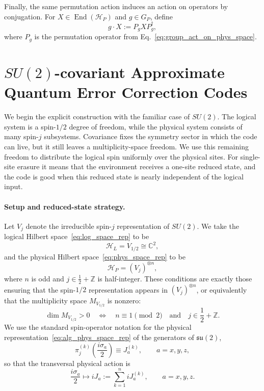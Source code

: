 \documentclass[10pt,twocolumn,superscriptaddress,aps,amsmath,amssymb,citeautoscript,floatfix,prx]{revtex4-2}
\newcounter{alg}
\theoremstyle{plain}
\theoremstyle{plain}
\theoremstyle{plain}
\theoremstyle{plain}
\theoremstyle{plain}
\theoremstyle{plain}
\theoremstyle{plain}
\theoremstyle{definition}
\theoremstyle{plain}
\begin{document}
Finally, the same permutation action induces an action on operators by conjugation. For $X\in\operatorname{End}(\mathcal H_P)$ and $g\in G_P$, define
\begin{equation}\label{eq:group_act_oper}
g\cdot X
:=
P_gXP_g^\dagger,
\end{equation}
where $P_g$ is the permutation operator from Eq.~\eqref{eq:group_act_on_phys_space}.

\section{\texorpdfstring{$SU(2)$}{SU(2)}-covariant Approximate Quantum Error Correction Codes}\label{sec:main_su2}

We begin the explicit construction with the familiar case of $SU(2)$. The logical system is a spin-$1/2$ degree of freedom, 
while the physical system consists of many spin-$j$ subsystems. Covariance fixes the symmetry sector in which the code can live, but it still leaves a multiplicity-space freedom. We use this remaining freedom to distribute the logical spin uniformly over the physical sites. For single-site erasure it means that the environment receives a one-site reduced state, and the code is good when this reduced state is nearly independent of the logical input.

\paragraph{Setup and reduced-state strategy.}

Let $V_j$ denote the irreducible spin-$j$ representation of $SU(2)$. We take the logical Hilbert space~\eqref{eq:log_space_rep} to be
\[
    \mathcal H_L = V_{1/2}\cong \mathbb C^2,
\]
and the physical Hilbert space~\eqref{eq:phys_space_rep} to be
\[
    \mathcal H_P = (V_j)^{\otimes n},
\]
where $n$ is odd and $j\in \frac12+\mathbb Z$ is half-integer. These conditions are exactly those ensuring that the spin-$1/2$ representation 
appears in $(V_j)^{\otimes n}$, or equivalently that the multiplicity space $M_{V_{1/2}}$ is nonzero:
\[
    \dim M_{V_{1/2}}>0
    \quad\Longleftrightarrow\quad
    n\equiv 1 \pmod 2
    \quad\text{and}\quad
    j\in \frac12+\mathbb Z .
\]
We use the standard spin-operator notation for the physical representation~\eqref{eq:alg_phys_space_rep} of the generators of $\mathfrak{su}(2)$,
\[
    \pi_j^{(k)}\left(\frac{i\sigma_a}{2}\right)
    \equiv J_a^{(k)},
    \qquad a=x,y,z,
\]
so that the transversal physical action is
\begin{equation}\label{eq:su2_cov_rep}
    \frac{i\sigma_a}{2}
    \longmapsto
    iJ_a
    :=
    \sum_{k=1}^n iJ_a^{(k)},
    \qquad a=x,y,z .
\end{equation}
\end{document}
